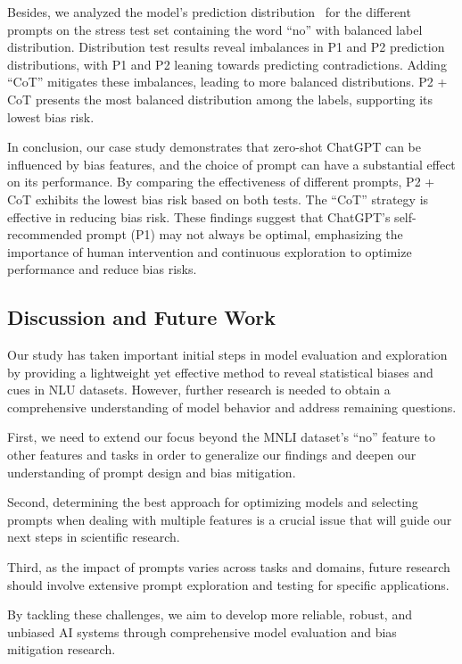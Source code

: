 Besides, we analyzed the model's prediction distribution~ 
for the different prompts on the stress test set 
containing the word ``no'' with balanced label distribution. 
Distribution test results reveal imbalances in P1 and P2 
prediction distributions, with P1 and P2 leaning towards 
predicting contradictions. Adding ``CoT'' mitigates these imbalances, 
leading to more balanced distributions. 
P2 + CoT presents the most balanced distribution 
among the labels, supporting its lowest bias risk.

In conclusion, 
our case study demonstrates that zero-shot 
ChatGPT can be influenced by bias features, and the 
choice of prompt can have a substantial effect on its performance.
By comparing the effectiveness of different prompts, 
P2 + CoT exhibits the lowest bias risk based on both tests. 
The ``CoT'' strategy is effective in reducing bias risk. 
These findings suggest that ChatGPT's self-recommended prompt 
(P1) may not always be optimal, emphasizing the importance of 
human intervention and continuous exploration to optimize performance and reduce bias risks. 

\subsection{Discussion and Future Work}
\label{sec:discussion}

Our study has taken important initial steps in model evaluation 
and exploration by providing a lightweight yet effective 
method to reveal statistical biases and cues in NLU datasets. However, further research is needed to obtain a comprehensive understanding of model behavior and address remaining questions.

First, 
we need to extend our focus beyond the MNLI dataset's 
``no'' feature to other features and tasks in order 
to generalize our findings and deepen our understanding of prompt design and bias mitigation.

Second, determining the best approach for optimizing models and selecting prompts 
when dealing with multiple features is a crucial issue that 
will guide our next steps in scientific research.

Third, as the impact of prompts varies across tasks and domains, 
future research should involve extensive prompt exploration and testing for specific applications.


By tackling these challenges, we aim to develop more 
reliable, robust, and unbiased AI systems through comprehensive model evaluation and bias mitigation research.


